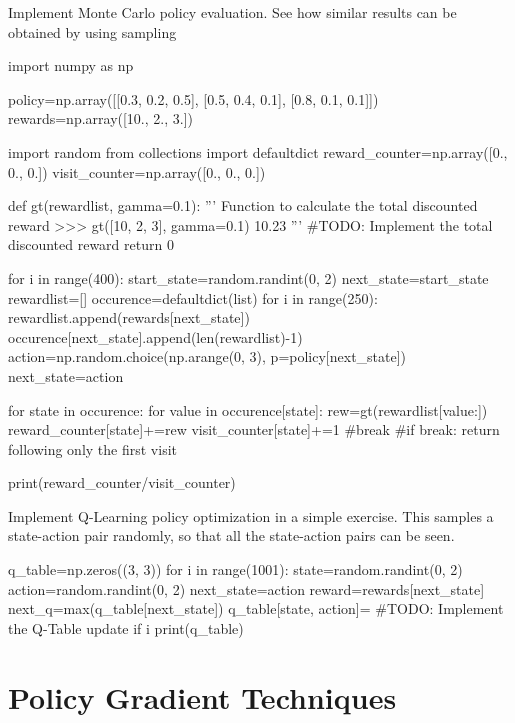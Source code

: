 \begin{exercise}
Implement Monte Carlo policy evaluation. See how similar results can be
obtained by using sampling
\begin{python}
import numpy as np

policy=np.array([[0.3, 0.2, 0.5], [0.5, 0.4, 0.1], [0.8, 0.1, 0.1]])
rewards=np.array([10., 2., 3.])

import random
from collections import defaultdict
reward_counter=np.array([0., 0., 0.])
visit_counter=np.array([0., 0., 0.])

def gt(rewardlist, gamma=0.1):
    '''
    Function to calculate the total discounted reward
    >>> gt([10, 2, 3], gamma=0.1)
    10.23
    '''
    #TODO: Implement the total discounted reward
    return 0

for i in range(400):
    start_state=random.randint(0, 2)
    next_state=start_state
    rewardlist=[]
    occurence=defaultdict(list) 
    for i in range(250):
        rewardlist.append(rewards[next_state]) 
        occurence[next_state].append(len(rewardlist)-1) 
        action=np.random.choice(np.arange(0, 3), p=policy[next_state]) 
        next_state=action

    for state in occurence: 
        for value in occurence[state]: 
            rew=gt(rewardlist[value:]) 
            reward_counter[state]+=rew 
            visit_counter[state]+=1 
            #break #if break: return following only the first visit

print(reward_counter/visit_counter)
\end{python}

Implement Q-Learning policy optimization in a simple exercise. This samples a state-action pair randomly, so that all the state-action pairs can be seen.
\begin{python}
q_table=np.zeros((3, 3)) 
for i in range(1001): 
    state=random.randint(0, 2) 
    action=random.randint(0, 2) 
    next_state=action
    reward=rewards[next_state] 
    next_q=max(q_table[next_state])
    q_table[state, action]= #TODO: Implement the Q-Table update
    if i%
        print(q_table)
\end{python}
\end{exercise}


\section{Policy Gradient Techniques}

